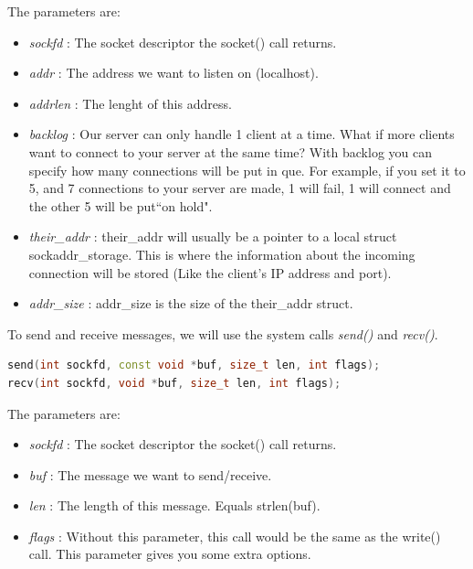 \documentclass{article}
\begin{document}
				The parameters are:

				\begin{itemize}
				\item \textit{sockfd} : The socket descriptor the socket() call returns. 
				\item \textit{addr} : The address we want to listen on (localhost). 
				\item \textit{addrlen} : The lenght of this address.
				\item \textit{backlog} : Our server can only handle 1 client at a time. What if more clients want to connect to your server at the same time? With backlog you can specify how many connections will be put in que. For example, if you set it to 5, and 7 connections to your server are made, 1 will fail, 1 will connect and the other 5 will be put``on hold".  
				\item \textit{their\_addr} : their\_addr will usually be a pointer to a local struct sockaddr\_storage. This is where the information about the incoming connection will be stored (Like the client's IP address and port). 
				\item \textit{addr\_size} : addr\_size is the size of the their\_addr struct. 
				\end{itemize}

				To send and receive messages, we will use the system calls \textit{send()} and \textit{recv()}.

				\begin{lstlisting}[language=C++, caption={getaddrinfo() function}]
send(int sockfd, const void *buf, size_t len, int flags); 
recv(int sockfd, void *buf, size_t len, int flags); 
				\end{lstlisting}

				The parameters are:

				\begin{itemize}
				\item \textit{sockfd} : The socket descriptor the socket() call returns. 
				\item \textit{buf} : The message we want to send/receive. 
				\item \textit{len} : The length of this message. Equals strlen(buf). 
				\item \textit{flags} : Without this parameter, this call would be the same as the write() call. This parameter gives you some extra options. 
				\end{itemize}
\end{document}
